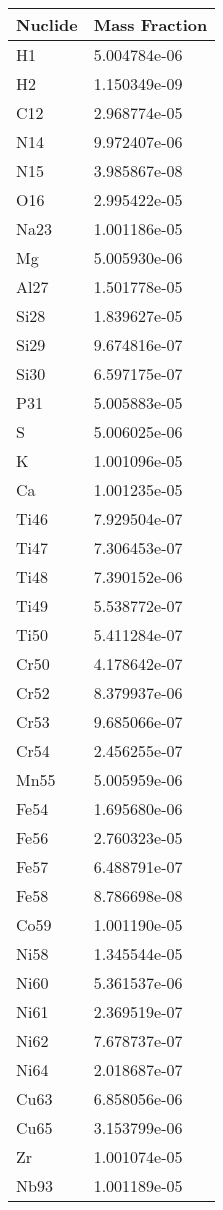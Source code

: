 \begin{centering}
\begin{longtable}[ht!]
{ p{} | p{} }
\hline
Nuclide & Mass Fraction\\
\hline
H1 & 5.004784e-06\\
H2 & 1.150349e-09\\
C12 & 2.968774e-05\\
N14 & 9.972407e-06\\
N15 & 3.985867e-08\\
O16 & 2.995422e-05\\
Na23 & 1.001186e-05\\
Mg & 5.005930e-06\\
Al27 & 1.501778e-05\\
Si28 & 1.839627e-05\\
Si29 & 9.674816e-07\\
Si30 & 6.597175e-07\\
P31 & 5.005883e-05\\
S & 5.006025e-06\\
K & 1.001096e-05\\
Ca & 1.001235e-05\\
Ti46 & 7.929504e-07\\
Ti47 & 7.306453e-07\\
Ti48 & 7.390152e-06\\
Ti49 & 5.538772e-07\\
Ti50 & 5.411284e-07\\
Cr50 & 4.178642e-07\\
Cr52 & 8.379937e-06\\
Cr53 & 9.685066e-07\\
Cr54 & 2.456255e-07\\
Mn55 & 5.005959e-06\\
Fe54 & 1.695680e-06\\
Fe56 & 2.760323e-05\\
Fe57 & 6.488791e-07\\
Fe58 & 8.786698e-08\\
Co59 & 1.001190e-05\\
Ni58 & 1.345544e-05\\
Ni60 & 5.361537e-06\\
Ni61 & 2.369519e-07\\
Ni62 & 7.678737e-07\\
Ni64 & 2.018687e-07\\
Cu63 & 6.858056e-06\\
Cu65 & 3.153799e-06\\
Zr & 1.001074e-05\\
Nb93 & 1.001189e-05\\

\end{longtable}
\end{centering}
